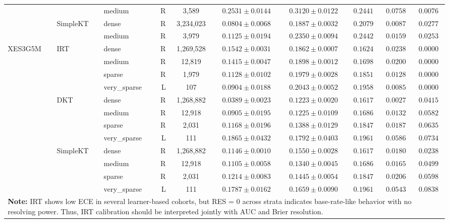 \begin{table}[htbp]
{\begin{tabular}{lllrcccccc}
 &  & medium & R & 3,589 & $0.2531 \pm 0.0144$ & $0.3120 \pm 0.0122$ & $0.2441$ & $0.0758$ & $0.0076$ \\
 & SimpleKT & dense & R & 3,234,023 & $0.0804 \pm 0.0068$ & $0.1887 \pm 0.0032$ & $0.2079$ & $0.0087$ & $0.0277$ \\
 &  & medium & R & 3,979 & $0.1125 \pm 0.0194$ & $0.2350 \pm 0.0094$ & $0.2442$ & $0.0159$ & $0.0253$ \\
\midrule
XES3G5M & IRT & dense & R & 1,269,528 & $0.1542 \pm 0.0031$ & $0.1862 \pm 0.0007$ & $0.1624$ & $0.0238$ & $0.0000$ \\
 &  & medium & R & 12,819 & $0.1415 \pm 0.0047$ & $0.1898 \pm 0.0012$ & $0.1698$ & $0.0200$ & $0.0000$ \\
 &  & sparse & R & 1,979 & $0.1128 \pm 0.0102$ & $0.1979 \pm 0.0028$ & $0.1851$ & $0.0128$ & $0.0000$ \\
 &  & very\_sparse & L & 107 & $0.0904 \pm 0.0188$ & $0.2043 \pm 0.0052$ & $0.1958$ & $0.0085$ & $0.0000$ \\
 & DKT & dense & R & 1,268,882 & $0.0389 \pm 0.0023$ & $0.1223 \pm 0.0020$ & $0.1617$ & $0.0027$ & $0.0415$ \\
 &  & medium & R & 12,918 & $0.0905 \pm 0.0195$ & $0.1225 \pm 0.0109$ & $0.1686$ & $0.0132$ & $0.0582$ \\
 &  & sparse & R & 2,031 & $0.1168 \pm 0.0196$ & $0.1388 \pm 0.0129$ & $0.1847$ & $0.0187$ & $0.0635$ \\
 &  & very\_sparse & L & 111 & $0.1865 \pm 0.0432$ & $0.1792 \pm 0.0403$ & $0.1961$ & $0.0586$ & $0.0734$ \\
 & SimpleKT & dense & R & 1,268,882 & $0.1146 \pm 0.0010$ & $0.1550 \pm 0.0028$ & $0.1617$ & $0.0180$ & $0.0238$ \\
 &  & medium & R & 12,918 & $0.1105 \pm 0.0058$ & $0.1340 \pm 0.0045$ & $0.1686$ & $0.0165$ & $0.0499$ \\
 &  & sparse & R & 2,031 & $0.1214 \pm 0.0083$ & $0.1445 \pm 0.0054$ & $0.1847$ & $0.0206$ & $0.0598$ \\
 &  & very\_sparse & L & 111 & $0.1787 \pm 0.0162$ & $0.1659 \pm 0.0090$ & $0.1961$ & $0.0543$ & $0.0838$ \\
\bottomrule
\multicolumn{10}{p{\textwidth}}{\textbf{Note:} IRT shows low ECE in several learner-based cohorts, but RES = 0 across strata indicates base-rate-like behavior with no resolving power. Thus, IRT calibration should be interpreted jointly with AUC and Brier resolution.} \\
\end{tabular}
}%

\end{table}
